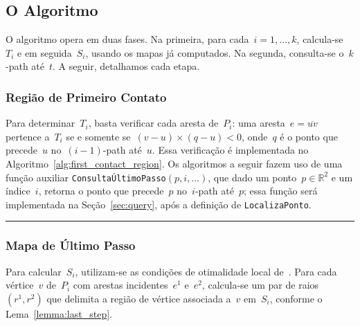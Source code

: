 \documentclass[11pt]{article}
\newcounter{algorithmref}
\newcommand{\alglabel}[1]{\refstepcounter{algorithmref}\label{#1}}
\newcommand{\algref}[1]{\ref{#1}}
\begin{document}
\subsection{O Algoritmo}

O algoritmo opera em duas fases. Na primeira, para cada~\(i = 1, \dots, k\), calcula-se~\(T_i\) e em seguida~\(S_i\), usando os mapas já computados. Na segunda, consulta-se o~\(k\)-path até~\(t\). A seguir, detalhamos cada etapa.

\subsubsection{Região de Primeiro Contato}

Para determinar~\(T_i\), basta verificar cada aresta de~\(P_i\): uma aresta~\(e = \overline{uv}\) pertence a~\(T_i\) se e somente se~\((v - u) \times (q - u) < 0\), onde~\(q\) é o ponto que precede~\(u\) no~\((i-1)\)-path até~\(u\). Essa verificação é implementada no Algoritmo~\algref{alg:first_contact_region}. Os algoritmos a seguir fazem uso de uma função auxiliar \texttt{ConsultaÚltimoPasso}\((p, i, \dots)\), que dado um ponto~\(p \in \mathbb{R}^2\) e um índice~\(i\), retorna o ponto que precede~\(p\) no~\(i\)-path até~\(p\); essa função será implementada na Seção~\ref{sec:query}, após a definição de \texttt{LocalizaPonto}.

\begin{algorithm}[h!]
\alglabel{alg:first_contact_region}
\caption{Região de Primeiro Contato}
\vspace{0.3em}\hrule\vspace{0.3em}
\end{algorithm}

\subsubsection{Mapa de Último Passo}

Para calcular~\(S_i\), utilizam-se as condições de otimalidade local de~\cite{tpp-dror-2003}. Para cada vértice~\(v\) de~\(P_i\) com arestas incidentes~\(e^1\) e~\(e^2\), calcula-se um par de raios~\((r^1, r^2)\) que delimita a região de vértice associada a~\(v\) em~\(S_i\), conforme o Lema~\ref{lemma:last_step}.
\end{document}
